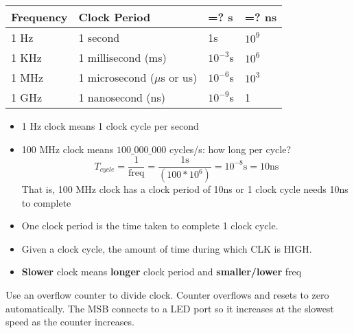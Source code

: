 \begin{tabular}[h]{llll}
  Frequency & Clock Period & =? s & =? ns \\
  \hline
  1 Hz & 1 second & 1s & $10^{9}$ \\
  1 KHz & 1 millisecond (ms) & $10^{-3}$s & $10^6$ \\
  1 MHz & 1 microsecond ($\mu$s or us) &  $10^{-6}$s & $10^3$ \\
  1 GHz & 1 nanosecond (ns) & $10^{-9}$s & 1
\end{tabular}
\begin{itemize}
\item 1 Hz clock means 1 clock cycle per second
\item 100 MHz clock means $100\_000\_000$ cycles/s: how long per cycle?
  \[
    T_{cycle} = \frac{1}{\text{freq}} = \frac{1\text{s}}{(100 * 10^{6})} = 10^{-8}\text{s} = 10\text{ns}
  \]
  That is, 100 MHz clock has a clock period of 10ns or 1 clock cycle needs 10ns to complete
\item One clock period is the time taken to complete 1 clock cycle.
\item Given a clock cycle, the amount of time during which CLK is HIGH.
\item \textbf{Slower} clock means \textbf{longer} clock period and \textbf{smaller/lower} freq
\end{itemize}
Use an overflow counter to divide clock. Counter overflows and resets to zero automatically. The MSB connects to a LED port so it increases at the slowest speed as the counter increases.
